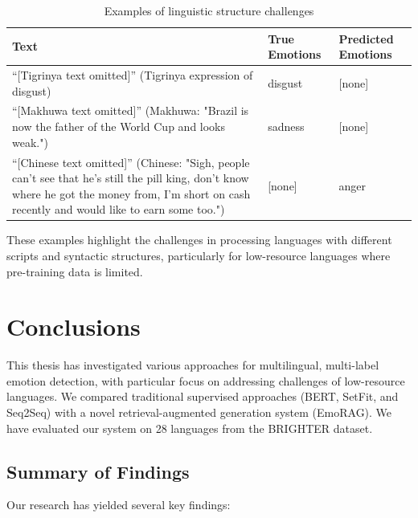 \documentclass[a4paper,12pt]{extarticle}
\begin{document}
\begin{table}[h]
\centering
\begin{tabular}{|p{8.5cm}|p{2.5cm}|p{2.5cm}|}
\hline
\textbf{Text} & \textbf{True Emotions} & \textbf{Predicted Emotions} \\
\hline
``[Tigrinya text omitted]'' \newline (Tigrinya expression of disgust) & disgust & [none] \\
\hline
``[Makhuwa text omitted]'' \newline (Makhuwa: "Brazil is now the father of the World Cup and looks weak.") & sadness & [none] \\
\hline
``[Chinese text omitted]'' \newline (Chinese: "Sigh, people can't see that he's still the pill king, don't know where he got the money from, I'm short on cash recently and would like to earn some too.") & [none] & anger \\
\hline
\end{tabular}
\caption{Examples of linguistic structure challenges}
\label{tab:linguistic-structure}
\end{table}

These examples highlight the challenges in processing languages with different scripts and syntactic structures, particularly for low-resource languages where pre-training data is limited.

\section{Conclusions}

This thesis has investigated various approaches for multilingual, multi-label emotion detection, with particular focus on addressing challenges of low-resource languages. We compared traditional supervised approaches (BERT, SetFit, and Seq2Seq) with a novel retrieval-augmented generation system (EmoRAG). We have evaluated our system on 28 languages from the BRIGHTER dataset.

\subsection{Summary of Findings}

Our research has yielded several key findings:
\end{document}
